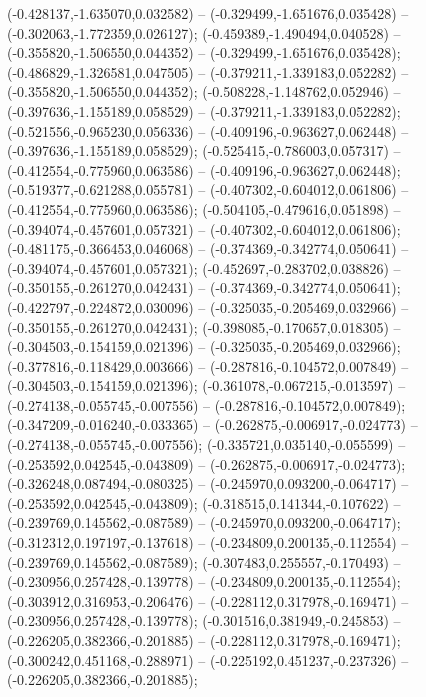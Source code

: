  (-0.428137,-1.635070,0.032582) -- (-0.329499,-1.651676,0.035428) -- (-0.302063,-1.772359,0.026127);
 (-0.459389,-1.490494,0.040528) -- (-0.355820,-1.506550,0.044352) -- (-0.329499,-1.651676,0.035428);
 (-0.486829,-1.326581,0.047505) -- (-0.379211,-1.339183,0.052282) -- (-0.355820,-1.506550,0.044352);
 (-0.508228,-1.148762,0.052946) -- (-0.397636,-1.155189,0.058529) -- (-0.379211,-1.339183,0.052282);
 (-0.521556,-0.965230,0.056336) -- (-0.409196,-0.963627,0.062448) -- (-0.397636,-1.155189,0.058529);
 (-0.525415,-0.786003,0.057317) -- (-0.412554,-0.775960,0.063586) -- (-0.409196,-0.963627,0.062448);
 (-0.519377,-0.621288,0.055781) -- (-0.407302,-0.604012,0.061806) -- (-0.412554,-0.775960,0.063586);
 (-0.504105,-0.479616,0.051898) -- (-0.394074,-0.457601,0.057321) -- (-0.407302,-0.604012,0.061806);
 (-0.481175,-0.366453,0.046068) -- (-0.374369,-0.342774,0.050641) -- (-0.394074,-0.457601,0.057321);
 (-0.452697,-0.283702,0.038826) -- (-0.350155,-0.261270,0.042431) -- (-0.374369,-0.342774,0.050641);
 (-0.422797,-0.224872,0.030096) -- (-0.325035,-0.205469,0.032966) -- (-0.350155,-0.261270,0.042431);
 (-0.398085,-0.170657,0.018305) -- (-0.304503,-0.154159,0.021396) -- (-0.325035,-0.205469,0.032966);
 (-0.377816,-0.118429,0.003666) -- (-0.287816,-0.104572,0.007849) -- (-0.304503,-0.154159,0.021396);
 (-0.361078,-0.067215,-0.013597) -- (-0.274138,-0.055745,-0.007556) -- (-0.287816,-0.104572,0.007849);
 (-0.347209,-0.016240,-0.033365) -- (-0.262875,-0.006917,-0.024773) -- (-0.274138,-0.055745,-0.007556);
 (-0.335721,0.035140,-0.055599) -- (-0.253592,0.042545,-0.043809) -- (-0.262875,-0.006917,-0.024773);
 (-0.326248,0.087494,-0.080325) -- (-0.245970,0.093200,-0.064717) -- (-0.253592,0.042545,-0.043809);
 (-0.318515,0.141344,-0.107622) -- (-0.239769,0.145562,-0.087589) -- (-0.245970,0.093200,-0.064717);
 (-0.312312,0.197197,-0.137618) -- (-0.234809,0.200135,-0.112554) -- (-0.239769,0.145562,-0.087589);
 (-0.307483,0.255557,-0.170493) -- (-0.230956,0.257428,-0.139778) -- (-0.234809,0.200135,-0.112554);
 (-0.303912,0.316953,-0.206476) -- (-0.228112,0.317978,-0.169471) -- (-0.230956,0.257428,-0.139778);
 (-0.301516,0.381949,-0.245853) -- (-0.226205,0.382366,-0.201885) -- (-0.228112,0.317978,-0.169471);
 (-0.300242,0.451168,-0.288971) -- (-0.225192,0.451237,-0.237326) -- (-0.226205,0.382366,-0.201885);
